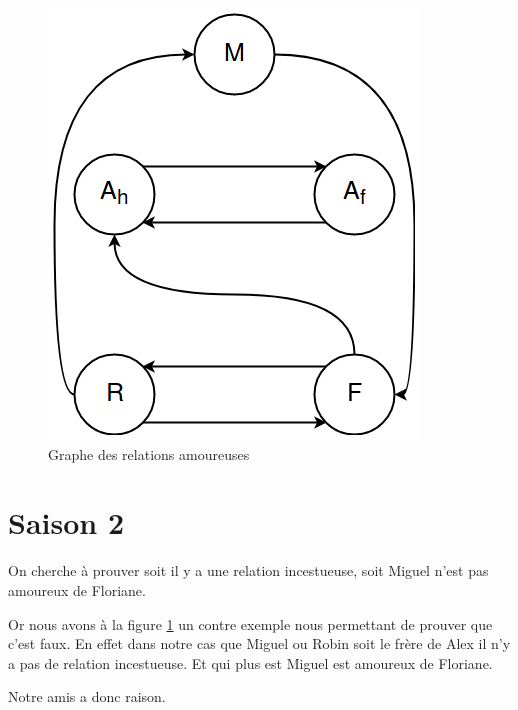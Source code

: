 \documentclass[12pt,a4paper,oneside]{article}
\begin{document}
		\begin{figure}[h]
			\includegraphics[scale = 0.7]{ex1.png}
			\centering
			\caption{Graphe des relations amoureuses}
			\label{lab1}
		\end{figure}

		\section{Saison 2}

		On cherche à prouver soit il y a une relation incestueuse, soit Miguel n’est pas
		amoureux de Floriane.

		Or nous avons à la figure \ref{lab1} un contre exemple nous permettant de prouver que
		c'est faux. En effet dans notre cas que Miguel ou Robin soit le frère de Alex il n'y a
		pas de relation incestueuse. Et qui plus est Miguel est amoureux de Floriane.

		Notre amis a donc raison.
\end{document}
